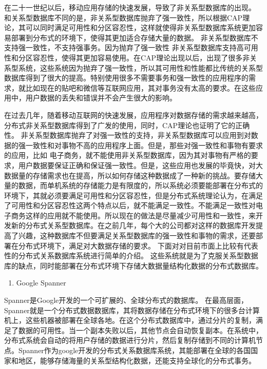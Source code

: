 在二十一世纪以后，移动应用存储的快速发展，导致了非关系型数据库的出现。
和关系型数据库不同的是，非关系型数据库抛弃了强一致性，所以根据CAP理论，其可以同时满足可用性和分区容忍性，这样就使得非关系型数据库系统更加容易部署到分布式的环境下，使得其更加适合存储大量的数据。 非关系型数据库不支持强一致性，不支持强事务。因为抛弃了强一致性
非关系型数据库支持高可用性和分区容忍性，使得其更加容易使用。在CAP理论出现以后，出现了很多非关系型系统，这些系统因为抛弃了强一致性，所以其可用性和性能都比传统的关系型数据库得到了很大的提高。特别使用很多不需要事务和强一致性的应用程序的需求，就比如现在的贴吧和微信等互联网应用，其对事务没有太高的要求。在这些应用中，用户数据的丢失和错误并不会产生很大的影响。


在过去几年，随着移动互联网的快速发展，应用程序对数据存储的需求越来越高，分布式非关系型数据库得到了广发的使用，同时，CAP理论也证明了它的正确性。
非关系型数据库抛弃了对强一致性的支持，非关系型数据库可以应用到对数据的强一致性和对事物不高的应用程序上面。但是，那些对强一致性和事物有要求的应用，比如
电子商务，就不能使用非关系型数据库，因为其对事物有严格的要求，用户数据要保证正确和保证强一致性。但是，这些应用也发展的毕竟快，对大数据量的存储需求也在提高，所以如何存储这种数据成了一种新的挑战。要存储大量的数据，而单机系统的存储能力是有限度的，所以系统必须要能部署在分布式的环境下，其就必须要满足可用性和分区容忍性，但是分布式系统理论认为，在满足了可用性和分区容忍性这两个特点以后，就不能满足一致性。不能满足一致性对电子商务这样的应用就不能使用。所以现在的做法是尽量减少可用性和一致性，来开发新的分布式关系型数据库。在之前几年，每个大的公司都对这样的数据库开发提高了兴趣，这种数据库不但要满足关系型数据库的强一致性和事物的需求，还要部署在分布式环境下，满足对大数据存储的要求。
下面对对目前市面上比较有代表性的分布式关系数据库系统进行简单的介绍。
这些系统就是为了克服关系型数据库的缺点，同时能部署在分布式环境下存储大数据量结构化数据的分布式数据库。

\begin{enumerate}
	\item Google Spanner
\end{enumerate}

	Spanner是Google开发的一个可扩展的、全球分布式的数据库。
	在最高层面，Spanner就是一个分布式数据数据库，其将数据存储在分布式环境下的很多台计算机上，这些机器被部署在全球各地。在这个分布式数据库中，通过分片的复制，满足了数据的可用性。当一个副本失败以后，其他节点会自动恢复副本。在系统中，分布式系统会自动的将用户存储的数据进行分片，然后复制存储到不同的计算机节点。Spanner作为google开发的分布式关系数据库系统，其能部署在全球的各国国家和地区，能够存储海量的关系型结构化数据，还能支持全球化的分布式事务。
		

